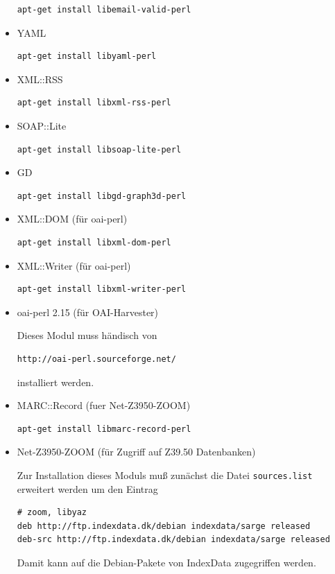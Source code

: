 \documentclass[11pt, twoside, a4paper, BCOR8mm, DIV12, bibtotoc,idxtotoc]{scrbook}
\begin{document}
\begin{itemize}
\begin{verbatim}
apt-get install libemail-valid-perl
\end{verbatim}
\item YAML
\begin{verbatim}
apt-get install libyaml-perl
\end{verbatim}
\item XML::RSS
\begin{verbatim}
apt-get install libxml-rss-perl
\end{verbatim}
\item SOAP::Lite
\begin{verbatim}
apt-get install libsoap-lite-perl
\end{verbatim}
\item GD
\begin{verbatim}
apt-get install libgd-graph3d-perl
\end{verbatim}
\item XML::DOM (für oai-perl)
\begin{verbatim}
apt-get install libxml-dom-perl
\end{verbatim}
\item XML::Writer (für oai-perl)
\begin{verbatim}
apt-get install libxml-writer-perl
\end{verbatim}
\item oai-perl 2.15 (für OAI-Harvester)

Dieses Modul muss händisch von
\begin{verbatim}
http://oai-perl.sourceforge.net/
\end{verbatim}
installiert werden.


\item MARC::Record (fuer Net-Z3950-ZOOM)
\begin{verbatim}
apt-get install libmarc-record-perl
\end{verbatim}

\item Net-Z3950-ZOOM (für Zugriff auf Z39.50 Datenbanken) 

Zur Installation dieses Moduls muß zunächst die Datei
  \texttt{sources.list} erweitert werden um den Eintrag
\begin{verbatim}
# zoom, libyaz
deb http://ftp.indexdata.dk/debian indexdata/sarge released
deb-src http://ftp.indexdata.dk/debian indexdata/sarge released
\end{verbatim}

Damit kann auf die Debian-Pakete von IndexData zugegriffen werden.


\end{itemize}
\end{document}
